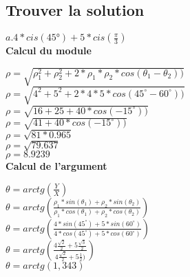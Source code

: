 \newpage

\vspace{3mm} %
\subsection{Trouver la solution}
\vspace{3mm} %

$a. 4*cis(45°) + 5*cis(\frac{\pi}{3})$\\

\textbf{Calcul du module} \\
\vspace{3mm} %

$\rho = \sqrt{\rho_1^{2}+\rho_2^{2} + 2 * \rho_1 * \rho_2 * cos(\theta_1-\theta_2))}$ \\

$\rho = \sqrt{4^{2}+5^{2} + 2*4*5 * cos(45^{\circ}-60^{\circ}))}$ \\

$\rho = \sqrt{16+25 + 40 * cos(-15^{\circ}))}$ \\

$\rho = \sqrt{41 + 40 * cos(-15^{\circ}))}$ \\

$\rho = \sqrt{81 * 0.965}$ \\

$\rho = \sqrt{79.637}$ \\

$\rho = 8.9239 $ \\

\textbf{Calcul de l'argument} \\
\vspace{3mm} %

$\theta = arctg(\frac{Y}{X})$ \\

$\theta = arctg(\frac{\rho_1 * sin(\theta_1) + \rho_2 * sin(\theta_2)} {\rho_1 * cos(\theta_1) + \rho_2 * cos(\theta_2)})$ \\

$\theta = arctg(\frac{4 * sin(45^{\circ}) + 5 * sin(60^{\circ})} {4 * cos(45^{\circ}) + 5 * cos(60^{\circ})})$ \\

$\theta = arctg(\frac{4\frac{\sqrt{2}} {2} + 5\frac{\sqrt{3}} {2}} {4\frac{\sqrt{2}} {2} + 5\frac{1} {2})})$ \\

$\theta = arctg(1,343)$ \\

